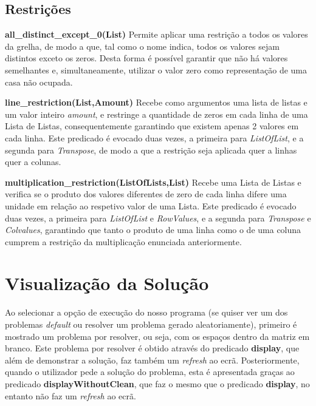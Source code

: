 \documentclass[11pt]{article}
\begin{document}
\subsection{Restrições}

\textbf{ all\_distinct\_except\_0(List)} Permite aplicar uma restrição a todos os valores da grelha, de modo a que, tal como o nome indica, todos os valores sejam distintos exceto os zeros. Desta forma é possível garantir que não há valores semelhantes e, simultaneamente, utilizar o valor zero como representação de uma casa não ocupada.

\bigskip

\textbf{line\_restriction(List,Amount)} Recebe como argumentos uma lista de listas e um valor inteiro \emph{amount}, e restringe a quantidade de zeros em cada linha de uma Lista de Listas, consequentemente garantindo que existem apenas 2 valores em cada linha. Este predicado é evocado duas vezes, a primeira para \emph{ListOfList}, e a segunda para \emph{Transpose}, de modo a que a restrição seja aplicada quer a linhas quer a colunas.

\bigskip

\textbf{multiplication\_restriction(ListOfLists,List)} Recebe uma Lista de Listas e verifica se o produto dos valores diferentes de zero de cada linha difere uma unidade em relação ao respetivo valor de uma Lista. Este predicado é evocado duas vezes, a primeira para \emph{ListOfList} e \emph{RowValues}, e a segunda para \emph{Transpose} e \emph{Colvalues}, garantindo que tanto o produto de uma linha como o de uma coluna cumprem a restrição da multiplicação enunciada anteriormente.

\pagebreak

\section{Visualização da Solução}

Ao selecionar a opção de execução do nosso programa (se quiser ver um dos problemas 
\textit{default} ou resolver um problema gerado aleatoriamente), primeiro é 
mostrado um problema por resolver, ou seja, com os espaços dentro da matriz em branco.
Este problema por resolver é obtido através do predicado \textbf{display}, que além
de demonstrar a solução, faz também um \textit{refresh} ao ecrã.
Posteriormente, quando o utilizador pede a solução do problema, esta é apresentada graças
ao predicado \textbf{displayWithoutClean}, que faz o mesmo que o predicado \textbf{display},
no entanto não faz um \textit{refresh} ao ecrã.
\end{document}
